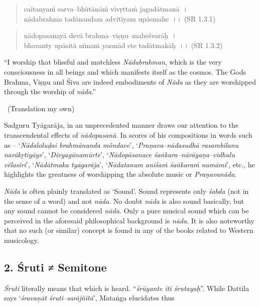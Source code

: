 \begin{verse}
caitanyaṁ sarva–bhūtānāṁ vivṛttaṁ jagadātmanā~।\\ nādabrahma tadānandam advitīyam upāsmahe~।। (SR 1.3.1)
\end{verse}

\begin{verse}
nādopasanayā devā brahma–viṣṇu–maheśvarāḥ~।\\ bhavanty upāsitā nūnaṁ yasmād ete tadātmakāḥ~।। (SR 1.3.2)
\end{verse}

\begin{myquote}
“I worship that blissful and matchless \textit{Nādabrahman}, which is the very consciousness in all beings and which manifests itself as the cosmos. The Gods Brahma, Viṣṇu and Śiva are indeed embodiments of \textit{Nāda} as they are worshipped through the worship of \textit{nāda}.” 

~\hfill (Translation my own)
\end{myquote}

Sadguru Tyāgarāja, in an unprecedented manner draws our attention to the transcendental effects of \textit{nādopasanā}. In scores of his compositions in words such as – ‘\textit{Nādaloluḍai brahmānanda môndave}’, ‘\textit{Praṇava–nādasudhā rasambilanu narākṛtiyāye}’, ‘\textit{Divyagānamūrte}’, ‘\textit{Nādopāsanace śaṅkara–nārāyaṇa–vidhulu vêlasiri}’, ‘\textit{Nādātmaka tyāgarāja}’, ‘\textit{Nādatanum aniśaṁ śaṅkaraṁ namāmi}’, etc., he highlights the greatness of worshipping the absolute music or \textit{Praṇavanāda}.

\textit{Nāda} is often plainly translated as ‘Sound’. Sound represents only \textit{śabda} (not in the sense of a word) and not \textit{nāda}. No doubt \textit{nāda} is also sound basically, but any sound cannot be considered \textit{nāda}. Only a pure musical sound which can be perceived in the aforesaid philosophical background is \textit{nāda}. It is also noteworthy that no such (or similar) concept is found in any of the books related to Western musicology.


\subsection*{2. Śruti ≠ Semitone}

\textit{Śruti} literally means that which is heard. “\textit{śrūyante iti śrutayaḥ}”. While Dattila says ‘\textit{śravaṇāt śruti–saṁjñitā}’, Mataṅga elucidates thus

